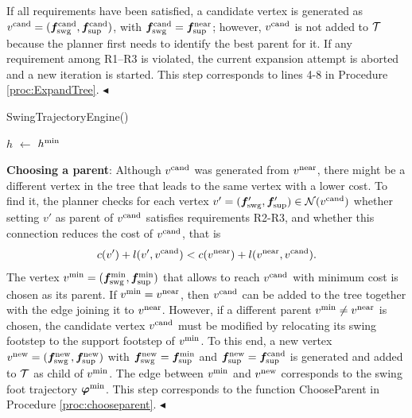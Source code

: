 If all requirements have been satisfied, a candidate vertex is generated as $v^{\rm cand} = ({\bm{f}}_{\rm swg}^{\rm cand}, {\bm{f}}_{\rm sup}^{\rm cand})$, with ${\bm{f}}_{\rm swg}^{\rm cand} = {\bm{f}}_{\rm sup}^{\rm near}$; however, $v^{\rm cand}$ is not added to $\cal T$ because the planner first needs to identify the best parent for it.
If any requirement among R1--R3 is violated, the current expansion attempt is aborted and a new iteration is started.
This step corresponds to lines 4-8 in Procedure \ref{proc:ExpandTree}.
\hfill $\blacktriangleleft$

\begin{procedure}%
	\small
	\removelatexerror
	
	\caption{SwingTrajectoryEngine()}
	\label{proc:genswgtraj}

    \BlankLine

	$h$ $\leftarrow$ $h^{\rm min}$\;
	
			
	\Return{$\emptyset$}\;	
\end{procedure}

{\bf Choosing a parent}: Although $v^{\rm cand}$ was generated from $v^{\rm near}$, there might be a different vertex in the tree that leads to the same vertex with a lower cost. To find it, the planner checks for each vertex $v' = ({\bm{f}}'_{\rm swg}, {\bm{f}}'_{\rm sup})\in {\cal N} (v^{\rm cand})$ whether setting $v'$ as parent of $v^{\rm cand}$ satisfies requirements R2-R3, and whether this connection reduces the cost of $v^{\rm cand}$, that is 
\[
c(v') + l(v', v^{\rm cand}) < c(v^{\rm near}) + l(v^{\rm near}, v^{\rm cand}).
\]
The vertex $v^{\rm min} = ({\bm{f}}_{\rm swg}^{\rm min}, {\bm{f}}_{\rm sup}^{\rm min})$ that allows to reach $v^{\rm cand}$ with minimum cost is chosen as its parent. If $v^{\rm min} = v^{\rm near}$, then $v^{\rm cand}$ can be added to the tree together with the edge joining it to $v^{\rm near}$. However, if a different parent $v^{\rm min} \neq v^{\rm near}$ is chosen, the candidate vertex $v^{\rm cand}$ must be modified by relocating its swing footstep to the support footstep of $v^{\rm min}$.
To this end, a new vertex $v^{\rm new} = ({\bm{f}}_{\rm swg}^{\rm new}, {\bm{f}}_{\rm sup}^{\rm new})$ with ${\bm{f}}_{\rm swg}^{\rm new} = {\bm{f}}_{\rm sup}^{\rm min}$ and ${\bm{f}}_{\rm sup}^{\rm new} = {\bm{f}}_{\rm sup}^{\rm cand}$ is generated and added to ${\cal T}$ as child of $v^{\rm min}$. The edge between $v^{\rm min}$ and $v^{\rm new}$ corresponds to the swing foot trajectory ${\bm{\varphi}}^{\rm min}$. 
This step corresponds to the function ChooseParent in Procedure \ref{proc:chooseparent}.
\hfill $\blacktriangleleft$

